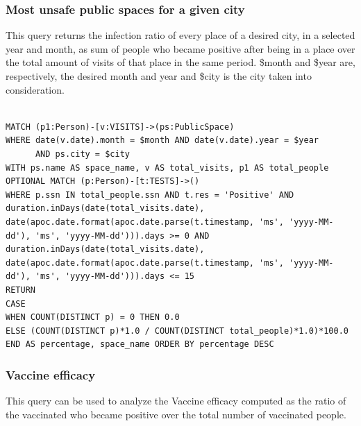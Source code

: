 \documentclass{article}
\begin{document}
\subsubsection{Most unsafe public spaces for a given city}
This query returns the infection ratio of every place of a desired city, in a selected year and month, as sum of people who became positive after being in a place over the total amount of visits of that place in the same period.
\$month and \$year are, respectively, the desired month and year and \$city is the city taken into consideration.
\begin{lstlisting}[language=cypher, label=lst:cypher-example]

MATCH (p1:Person)-[v:VISITS]->(ps:PublicSpace)
WHERE date(v.date).month = $month AND date(v.date).year = $year
      AND ps.city = $city
WITH ps.name AS space_name, v AS total_visits, p1 AS total_people
OPTIONAL MATCH (p:Person)-[t:TESTS]->()
WHERE p.ssn IN total_people.ssn AND t.res = 'Positive' AND duration.inDays(date(total_visits.date), date(apoc.date.format(apoc.date.parse(t.timestamp, 'ms', 'yyyy-MM-dd'), 'ms', 'yyyy-MM-dd'))).days >= 0 AND duration.inDays(date(total_visits.date), date(apoc.date.format(apoc.date.parse(t.timestamp, 'ms', 'yyyy-MM-dd'), 'ms', 'yyyy-MM-dd'))).days <= 15
RETURN
CASE
WHEN COUNT(DISTINCT p) = 0 THEN 0.0
ELSE (COUNT(DISTINCT p)*1.0 / COUNT(DISTINCT total_people)*1.0)*100.0
END AS percentage, space_name ORDER BY percentage DESC
\end{lstlisting}
\newpage
\subsubsection{Vaccine efficacy}
This query can be used to analyze the Vaccine efficacy computed as the ratio of the vaccinated who became positive over the total number of vaccinated people.
\end{document}
